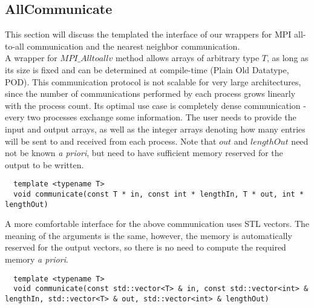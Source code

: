 \subsection{AllCommunicate}
\label{interface-allcommunicate}

This section will discuss the templated the interface of our wrappers for MPI all-to-all communication and the nearest neighbor communication. \\

\noindent
A wrapper for $MPI\_Alltoallv$ method allows arrays of arbitrary type $T$, as long as its size is fixed and can be determined at compile-time (Plain Old Datatype, POD). This communication protocol is not scalable for very large architectures, since the number of communications performed by each process grows linearly with the process count. Its optimal use case is completely dense communication - every two processes exchange some information. The user needs to provide the input and output arrays, as well as the integer arrays denoting how many entries will be sent to and received from each process. Note that $out$ and $lengthOut$ need not be known \textit{a priori}, but need to have sufficient memory reserved for the output to be written.
\begin{mybox}
\begin{lstlisting}
  template <typename T>
  void communicate(const T * in, const int * lengthIn, T * out, int * lengthOut)
\end{lstlisting}
\end{mybox}
\noindent
A more comfortable interface for the above communication uses STL vectors. The meaning of the arguments is the same, however, the memory is automatically reserved for the output vectors, so there is no need to compute the required memory \textit{a priori}.
\begin{mybox}
\begin{lstlisting}
  template <typename T>
  void communicate(const std::vector<T> & in, const std::vector<int> & lengthIn, std::vector<T> & out, std::vector<int> & lengthOut)
\end{lstlisting}
\end{mybox}

